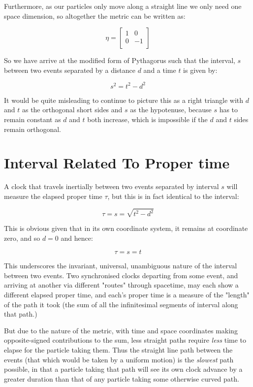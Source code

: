 Furthermore, as our particles only move along a straight line we only need one space dimension, so altogether the metric can be written as:

$$
\eta =
\begin{bmatrix}
1 & 0 \\
0 & -1 \\
\end{bmatrix}
$$

So we have arrive at the modified form of Pythagorus such that the interval, $s$ between two events separated by a distance $d$ and a time $t$ is given by:

$$s^2 = t^2 - d^2$$

It would be quite misleading to continue to picture this as a right triangle with $d$ and $t$ as the orthogonal short sides and $s$ as the hypotenuse, because $s$ has to remain constant as $d$ and $t$ both increase, which is impossible if the $d$ and $t$ sides remain orthogonal.

\section{Interval Related To Proper time}

A clock that travels inertially between two events separated by interval $s$ will measure the elapsed proper time $\tau$, but this is in fact identical to the interval:

$$\tau = s = \sqrt{t^2 - d^2}$$

This is obvious given that in its own coordinate system, it remains at coordinate zero, and so $d = 0$ and hence:

$$\tau = s = t$$

This underscores the invariant, universal, unambiguous nature of the interval between two events. Two synchronised clocks departing from some event, and arriving at another via different "routes" through spacetime, may each show a different elapsed proper time, and each's proper time is a measure of the "length" of the path it took (the sum of all the infinitesimal segments of interval along that path.)

But due to the nature of the metric, with time and space coordinates making opposite-signed contributions to the sum, less straight paths require \textit{less} time to elapse for the particle taking them. Thus the straight line path between the events (that which would be taken by a uniform motion) is the \textit{slowest} path possible, in that a particle taking that path will see its own clock advance by a greater duration than that of any particle taking some otherwise curved path.


